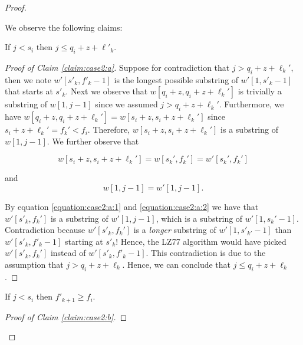 \begin{proof}
\begin{enumerate}
    
We observe the following claims:
    \begin{claim}
    \label{claim:case2:a}
    If $j<s_i$ then $j \leq q_i+z+\ell'_k$.
    \end{claim}

\begin{proof}[Proof of Claim \ref{claim:case2:a}]
    Suppose for contradiction that $j>q_i+z+\ell_k'$, then we note $w'[s'_k,f'_k-1] $ is the longest possible substring of $w'[1,s'_{k}-1]$ that starts at $s'_k$. Next we observe that $w[q_{i}+z,q_i+z+\ell_k']$ is trivially a substring of $w[1,j-1]$ since we assumed $j>q_i+z+\ell_k'$. Furthermore, we have $w[q_{i}+z,q_i+z+\ell_k']=w[s_{i}+z,s_i+z+\ell_k']$ since $s_i+z+\ell_k'=f_k'<f_i$. Therefore,        
        $w[s_{i}+z,s_i+z+\ell_k']$ is a substring of $w[1,j-1]$. We further observe that

        \begin{equation}
           w[s_i+z,s_i+z+\ell_k']=w[s_k',f_k']=w'[s_k',f_k']
           \label{equation:case2:a:1}
        \end{equation}
    
    and
    \begin{equation}
        w[1,j-1]=w'[1,j-1].
        \label{equation:case2:a:2}
    \end{equation}


By equation \eqref{equation:case2:a:1} and \eqref{equation:case2:a:2} we have that $w'[s'_k,f_k']$ is a substring of $w'[1,j-1]$, which is a substring of $w'[1,s_k'-1]$. %
Contradiction because $w'[s'_k,f_k']$ is a \emph{longer} substring of $w'[1,s'_{k'}-1]$ than $w'[s'_k,f'_k-1]$ starting at $s'_k$! Hence, the LZ77 algorithm would have picked $w'[s'_k,f_k']$ instead of $w'[s'_k,f'_k-1]$. This contradiction is due to the assumption that $j>q_i+z+\ell_k$. Hence, we can conclude that $j\leq q_i+z+\ell_k$.
\end{proof}

    



    \begin{claim}
    \label{claim:case2:b}
    If $j<s_i$ then $f'_{k+1}\geq f_i$.
    \end{claim}
    \begin{proof}[Proof of Claim 
    \ref{claim:case2:b}]



\end{proof}
\end{enumerate}
\end{proof}
